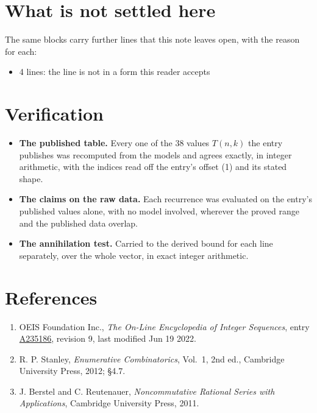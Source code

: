 \documentclass[11pt]{article}
\theoremstyle{definition}
\begin{document}
\section{What is not settled here}

The same blocks carry further lines that this note leaves open, with the reason for each:

\begin{itemize}

\item 4 lines: the line is not in a form this reader accepts

\end{itemize}

\section{Verification}

\begin{itemize}

\item {\bfseries The published table.} Every one of the 38 values $T(n,k)$ the entry publishes was recomputed from the models and agrees exactly, in integer arithmetic, with the indices read off the entry's offset (1) and its stated shape.

\item {\bfseries The claims on the raw data.} Each recurrence was evaluated on the entry's published values alone, with no model involved, wherever the proved range and the published data overlap.

\item {\bfseries The annihilation test.} Carried to the derived bound for each line separately, over the whole vector, in exact integer arithmetic.

\end{itemize}

\section{References}

\begin{enumerate}

\item OEIS Foundation Inc., \emph{The On-Line Encyclopedia of Integer Sequences}, entry \href{https://oeis.org/A235186}{A235186}, revision 9, last modified Jun 19 2022.

\item R. P. Stanley, \emph{Enumerative Combinatorics}, Vol.~1, 2nd ed., Cambridge University Press, 2012; \S4.7.

\item J. Berstel and C. Reutenauer, \emph{Noncommutative Rational Series with Applications}, Cambridge University Press, 2011.

\end{enumerate}
\end{document}

